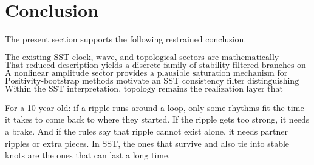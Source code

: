 \documentclass[11pt]{article}
\theoremstyle{definition}
\theoremstyle{plain}
\begin{document}
\section{Conclusion}\label{sec:conclusion}

The present section supports the following restrained conclusion.

\begin{equation}
\boxed{
\text{The existing SST clock, wave, and topological sectors are mathematically compatible with a reduced delay-loop description.}
}
\end{equation}
\begin{equation}
\boxed{
\text{That reduced description yields a discrete family of stability-filtered branches on closed loops.}
}
\end{equation}
\begin{equation}
\boxed{
\text{A nonlinear amplitude sector provides a plausible saturation mechanism for branch survival above threshold.}
}
\end{equation}
\begin{equation}
\boxed{
\text{Positivity-bootstrap methods motivate an SST consistency filter distinguishing isolated reduced sectors from those that require companion fields or coupled channels.}
}
\end{equation}
\begin{equation}
\boxed{
\text{Within the SST interpretation, topology remains the realization layer that converts surviving admissible branches into long-lived states.}
}
\end{equation}

For a 10-year-old: if a ripple runs around a loop, only some rhythms fit the time it takes to come back to where they started. If the ripple gets too strong, it needs a brake. And if the rules say that ripple cannot exist alone, it needs partner ripples or extra pieces. In SST, the ones that survive and also tie into stable knots are the ones that can last a long time.
\end{document}
